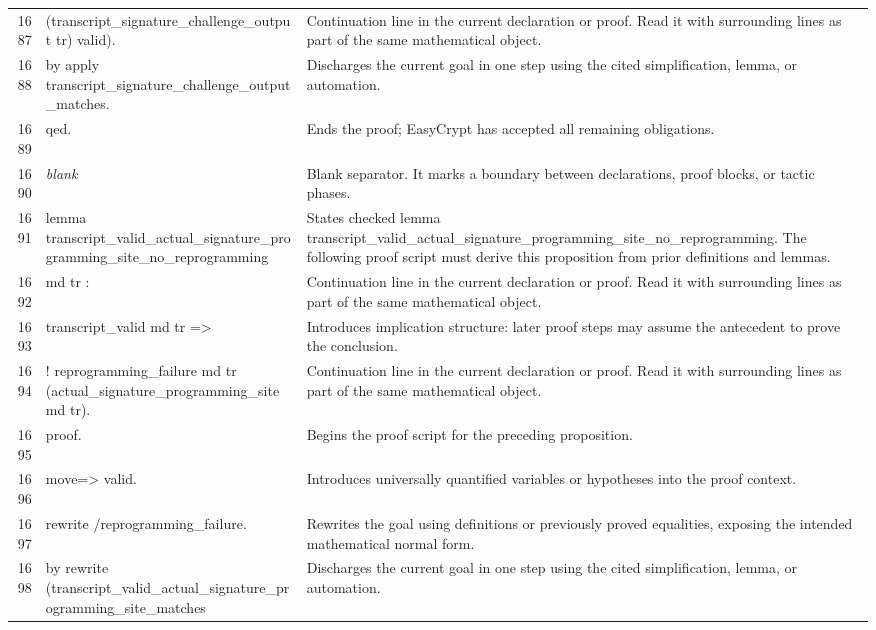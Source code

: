 \documentclass[10pt]{article}
\begin{document}
\begin{longtable}{r L{0.53\textwidth} L{0.37\textwidth}}
1687 & {\ttfamily\scriptsize          (transcript\_signature\_challenge\_output tr) valid).} & Continuation line in the current declaration or proof.  Read it with surrounding lines as part of the same mathematical object. \\
1688 & {\ttfamily\scriptsize by apply transcript\_signature\_challenge\_output\_matches.} & Discharges the current goal in one step using the cited simplification, lemma, or automation. \\
1689 & {\ttfamily\scriptsize qed.} & Ends the proof; EasyCrypt has accepted all remaining obligations. \\
1690 & {\ttfamily\scriptsize \emph{blank}} & Blank separator.  It marks a boundary between declarations, proof blocks, or tactic phases. \\
1691 & {\ttfamily\scriptsize lemma transcript\_valid\_actual\_signature\_programming\_site\_no\_reprogramming} & States checked lemma transcript\_valid\_actual\_signature\_programming\_site\_no\_reprogramming.  The following proof script must derive this proposition from prior definitions and lemmas. \\
1692 & {\ttfamily\scriptsize   md tr :} & Continuation line in the current declaration or proof.  Read it with surrounding lines as part of the same mathematical object. \\
1693 & {\ttfamily\scriptsize   transcript\_valid md tr =>} & Introduces implication structure: later proof steps may assume the antecedent to prove the conclusion. \\
1694 & {\ttfamily\scriptsize   ! reprogramming\_failure md tr (actual\_signature\_programming\_site md tr).} & Continuation line in the current declaration or proof.  Read it with surrounding lines as part of the same mathematical object. \\
1695 & {\ttfamily\scriptsize proof.} & Begins the proof script for the preceding proposition. \\
1696 & {\ttfamily\scriptsize move=> valid.} & Introduces universally quantified variables or hypotheses into the proof context. \\
1697 & {\ttfamily\scriptsize rewrite /reprogramming\_failure.} & Rewrites the goal using definitions or previously proved equalities, exposing the intended mathematical normal form. \\
1698 & {\ttfamily\scriptsize by rewrite (transcript\_valid\_actual\_signature\_programming\_site\_matches} & Discharges the current goal in one step using the cited simplification, lemma, or automation. \\

\end{longtable}
\end{document}
